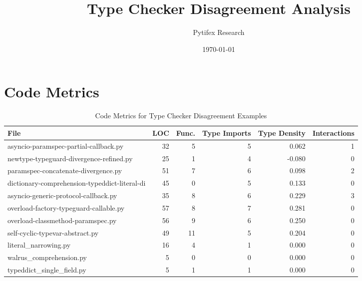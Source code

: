 \documentclass{article}
\title{Type Checker Disagreement Analysis}
\author{Pytifex Research}
\date{\today}
\begin{document}
\maketitle
\thispagestyle{empty}
\newpage

\section{Code Metrics}
\begin{table}[htbp]
\centering
\begin{tabular}{lrrrrr}
\toprule
File & LOC & Func. & Type Imports & Type Density & Interactions \\
\midrule
asyncio-paramspec-partial-callback.py & 32 & 5 & 5 & 0.062 & 1 \\
newtype-typeguard-divergence-refined.py & 25 & 1 & 4 & -0.080 & 0 \\
paramspec-concatenate-divergence.py & 51 & 7 & 6 & 0.098 & 2 \\
dictionary-comprehension-typeddict-literal-di & 45 & 0 & 5 & 0.133 & 0 \\
asyncio-generic-protocol-callback.py & 35 & 8 & 6 & 0.229 & 3 \\
overload-factory-typeguard-callable.py & 57 & 8 & 7 & 0.281 & 0 \\
overload-classmethod-paramspec.py & 56 & 9 & 6 & 0.250 & 0 \\
self-cyclic-typevar-abstract.py & 49 & 11 & 5 & 0.204 & 0 \\
literal\_narrowing.py & 16 & 4 & 1 & 0.000 & 0 \\
walrus\_comprehension.py & 5 & 0 & 0 & 0.000 & 0 \\
typeddict\_single\_field.py & 5 & 1 & 1 & 0.000 & 0 \\
\bottomrule
\end{tabular}
\caption{Code Metrics for Type Checker Disagreement Examples}
\label{tab:metrics}
\end{table}
\end{document}

